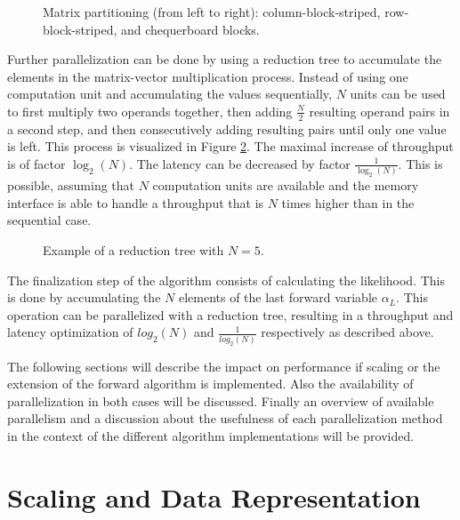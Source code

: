 \documentclass[mscthesis]{usiinfthesis}
\begin{document}
\begin{figure}
    \centering
    
    \caption{Matrix partitioning (from left to right): column-block-striped,
        row-block-striped, and chequerboard blocks.}
    \label{fig:matrix_partitioning}
\end{figure}

Further parallelization can be done by using a reduction tree to accumulate the
elements in the matrix-vector multiplication process. Instead of using one
computation unit and accumulating the values sequentially, $N$ units can be used
to first multiply two operands together, then adding $\frac{N}{2}$ resulting
operand pairs in a second step, and then consecutively adding resulting pairs
until only one value is left. This process is visualized in Figure
\ref{fig:red_tree}. The maximal increase of throughput is of factor
$\log_2(N)$. The latency can be decreased by factor $\frac{1}{\log_2(N)}$.
This is possible, assuming that $N$ computation units are available and the
memory interface is able to handle a throughput that is $N$ times higher than
in the sequential case.

\begin{figure}
    \centering
    
    \caption{Example of a reduction tree with $N=5$.}
    \label{fig:red_tree}
\end{figure}

The finalization step of the algorithm consists of calculating the likelihood.
This is done by accumulating the $N$ elements of the last forward variable
$\alpha_L$. This operation can be parallelized with a reduction tree, resulting
in a throughput and latency optimization of $log_2(N)$ and $\frac{1}{log_2(N)}$
respectively as described above.

The following sections will describe the impact on performance if scaling or
the extension of the forward algorithm is implemented. Also the availability of
parallelization in both cases will be discussed. Finally an overview of
available parallelism and a discussion about the usefulness of each
parallelization method in the context of the different algorithm
implementations will be provided.

\section{Scaling and Data Representation}
\label{ch:analysis_scaling}
\end{document}
